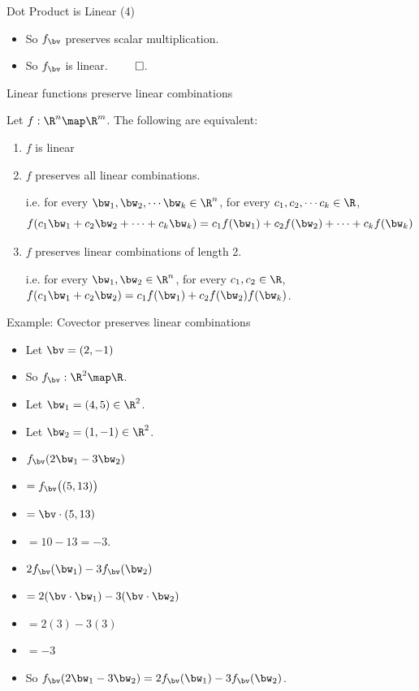 \documentclass{beamer}
\begin{document}
\begin{frame}{Dot Product is Linear (4)}

\begin{itemize}
\item So $f_{\bv}$ preserves scalar multiplication.
\item So $f_{\bv}$ is linear. $\qed$.
\end{itemize}

\end{frame}

\begin{frame}{Linear functions preserve linear combinations}
\begin{lemma}
Let $f:\R^n\map\R^m$. The following are equivalent:
\begin{enumerate}
\item $f$ is linear
\item $f$ preserves all linear combinations.

\pause

i.e. for every
$\bw_1,\bw_2,\cdots\bw_k\in\R^n$, for every $c_1,c_2,\cdots c_k\in\R$,
$$f(c_1 \bw_1 + c_2 \bw_2 + \cdots + c_k \bw_k) = c_1 f(\bw_1) + c_2 f(\bw_2) + \cdots + c_k f(\bw_k)$$

\pause

\item $f$ preserves linear combinations of length 2.

\pause

i.e. for every $\bw_1,\bw_2\in\R^n$, for every $c_1,c_2\in\R$,
$f(c_1 \bw_1 + c_2 \bw_2) = c_1 f(\bw_1) + c_2 f(\bw_2) f(\bw_k)$.

\end{enumerate}
\end{lemma}
\end{frame}


\begin{frame}{Example: Covector preserves linear combinations}

\begin{itemize}
\item Let $\bv = (2, -1)$
\item So $f_{\bv}:\R^2 \map \R$.
\item Let $\bw_1 = (4, 5) \in \R^2$.
\item Let $\bw_2 = (1,-1) \in \R^2$.
\item $f_\bv(2\bw_1 -3\bw_2)$
\item $=f_\bv\bigl((5, 13)\bigr)$
\item $=\bv \cdot (5, 13)$
\item $=10 - 13 = -3$.
\item $2 f_{\bv}(\bw_1) -3 f_{\bv}(\bw_2)$
\item $= 2 (\bv \cdot \bw_1) -3 (\bv \cdot \bw_2)$
\item $=2 (3) - 3(3)$
\item $=-3$
\item So $f_\bv(2\bw_1 -3\bw_2) = 2f_{\bv}(\bw_1) -3 f_{\bv}(\bw_2)$.
\end{itemize}

\end{frame}
\end{document}

